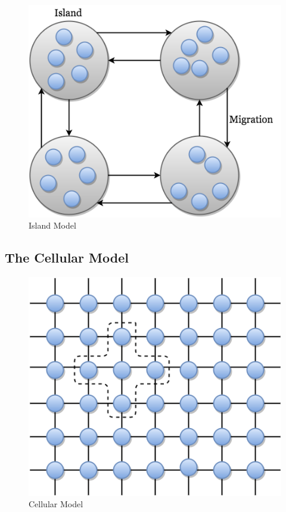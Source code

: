 \documentclass{article}
\begin{document}
\begin{figure}[h!]
\begin{center}
\includegraphics[scale=0.5]{"Island Model"}
\caption{Island Model}
\end{center}
\label{Island Model}
\end{figure}


\subsection{The Cellular Model}


\begin{figure}[h!]
\begin{center}
\includegraphics[scale=0.5]{"Cellular Model"}
\caption{Cellular Model}
\end{center}
\label{Cellular Model}
\end{figure}
\end{document}
